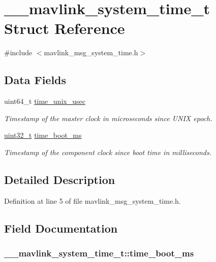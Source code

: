 \hypertarget{struct____mavlink__system__time__t}{\section{\-\_\-\-\_\-mavlink\-\_\-system\-\_\-time\-\_\-t Struct Reference}
\label{struct____mavlink__system__time__t}
}


{\ttfamily \#include $<$mavlink\-\_\-msg\-\_\-system\-\_\-time.\-h$>$}

\subsection*{Data Fields}
\begin{DoxyCompactItemize}
\item 
uint64\-\_\-t \hyperlink{struct____mavlink__system__time__t_ae546feebc5c1920448812ff0f2432366}{time\-\_\-unix\-\_\-usec}
\begin{DoxyCompactList}\small\item\em Timestamp of the master clock in microseconds since U\-N\-I\-X epoch. \end{DoxyCompactList}\item 
\hyperlink{stdint_8h_a435d1572bf3f880d55459d9805097f62}{uint32\-\_\-t} \hyperlink{struct____mavlink__system__time__t_a262df1d58382c46c44f1612382335c46}{time\-\_\-boot\-\_\-ms}
\begin{DoxyCompactList}\small\item\em Timestamp of the component clock since boot time in milliseconds. \end{DoxyCompactList}\end{DoxyCompactItemize}


\subsection{Detailed Description}


Definition at line 5 of file mavlink\-\_\-msg\-\_\-system\-\_\-time.\-h.



\subsection{Field Documentation}
\hypertarget{struct____mavlink__system__time__t_a262df1d58382c46c44f1612382335c46}{
\subsubsection[{time\-\_\-boot\-\_\-ms}]{ \-\_\-\-\_\-mavlink\-\_\-system\-\_\-time\-\_\-t\-::time\-\_\-boot\-\_\-ms}}\label{struct____mavlink__system__time__t_a262df1d58382c46c44f1612382335c46}


